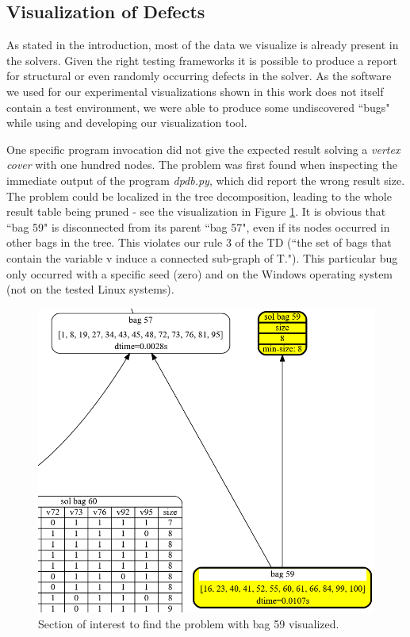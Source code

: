 \documentclass[a4paper, 12pt, bibliography=totoc]{scrartcl}
\begin{document}
\subsection{Visualization of Defects}
 
As stated in the introduction, most of the data we visualize is already present in the solvers.
Given the right testing frameworks it is possible to produce a report for structural or even randomly occurring defects in the solver. As the software we used for our experimental visualizations shown in this work does not itself contain a test environment, we were able to produce some undiscovered ``bugs" while using and developing our visualization tool.


 One specific program invocation did not give the expected result solving a \textit{vertex cover} with one hundred nodes. The problem was first found when inspecting the immediate output of the program \textit{dpdb.py}, which did report the wrong result size. The problem could be localized in the tree decomposition, leading to the whole result table being pruned - see the visualization in Figure \ref{fig:starsbag59}. It is obvious that ``bag 59" is disconnected from its parent ``bag 57", even if its nodes occurred in other bags in the tree. This violates our rule $3$ of the TD (``the set of bags that contain the variable v induce a connected sub-graph of T.").  This particular bug only occurred  with a specific seed (zero) and on the Windows operating system (not on the tested Linux systems). 

\begin{figure}
	\centering
	\vspace{1em}
	\includegraphics[width=0.8\linewidth,height=0.9\textheight,keepaspectratio
					]{images/starsbag59.png}
		\vspace{1em}
	\caption{Section of interest to find the problem with bag 59 visualized.}
	\label{fig:starsbag59}
\end{figure}
\end{document}
